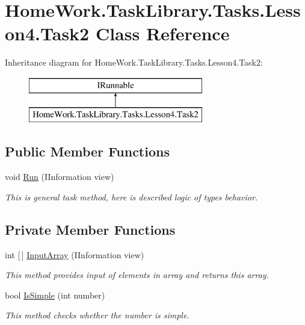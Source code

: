 \hypertarget{class_home_work_1_1_task_library_1_1_tasks_1_1_lesson4_1_1_task2}{}\section{Home\+Work.\+Task\+Library.\+Tasks.\+Lesson4.\+Task2 Class Reference}
\label{class_home_work_1_1_task_library_1_1_tasks_1_1_lesson4_1_1_task2}
Inheritance diagram for Home\+Work.\+Task\+Library.\+Tasks.\+Lesson4.\+Task2\+:\begin{figure}[H]
\begin{center}
\leavevmode
\includegraphics[height=2.000000cm]{class_home_work_1_1_task_library_1_1_tasks_1_1_lesson4_1_1_task2}
\end{center}
\end{figure}
\subsection*{Public Member Functions}
\begin{DoxyCompactItemize}
\item 
void \mbox{\hyperlink{class_home_work_1_1_task_library_1_1_tasks_1_1_lesson4_1_1_task2_a3f9750bb2f161d0a9e16a96087c868da}{Run}} (I\+Information view)
\begin{DoxyCompactList}\small\item\em This is general task method, here is described logic of types behavior. \end{DoxyCompactList}\end{DoxyCompactItemize}
\subsection*{Private Member Functions}
\begin{DoxyCompactItemize}
\item 
int \mbox{[}$\,$\mbox{]} \mbox{\hyperlink{class_home_work_1_1_task_library_1_1_tasks_1_1_lesson4_1_1_task2_a6dea6a693b3aab1b494ddfc03b919a57}{Input\+Array}} (I\+Information view)
\begin{DoxyCompactList}\small\item\em This method provides input of elements in array and returns this array. \end{DoxyCompactList}\item 
bool \mbox{\hyperlink{class_home_work_1_1_task_library_1_1_tasks_1_1_lesson4_1_1_task2_a48fcc044b17cfbb8747671cae85fbd98}{Is\+Simple}} (int number)
\begin{DoxyCompactList}\small\item\em This method checks whether the number is simple. \end{DoxyCompactList}\end{DoxyCompactItemize}


